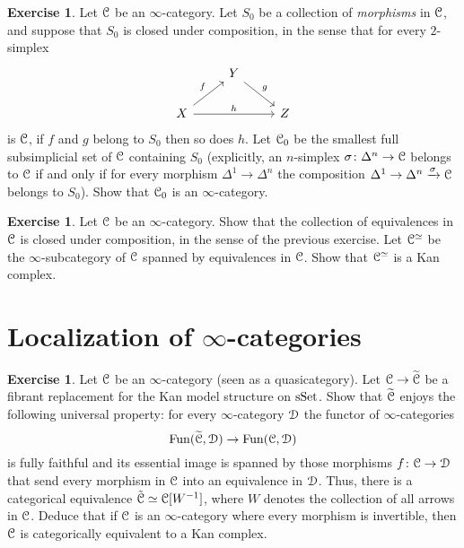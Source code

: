 \documentclass[10pt,a4paper,reqno,oneside]{book} %
\theoremstyle{plain}
\theoremstyle{definition}
\newtheorem{exercise}[thm]{Exercise}
\theoremstyle{remark}
\numberwithin{equation}{section}
\begin{document}
\begin{exercise}
	Let $\mathcal C$ be an $\infty$-category.
	Let $S_0$ be a collection of \emph{morphisms} in $\mathcal C$, and suppose that $S_0$ is closed under composition, in the sense that for every $2$-simplex
	\[ \begin{tikzcd}
	{} & Y \arrow{dr}{g} \\
	X \arrow{ur}{f} \arrow{rr}{h} & & Z
	\end{tikzcd} \]
	is $\mathcal C$, if $f$ and $g$ belong to $S_0$ then so does $h$.
	Let $\mathcal C_0$ be the smallest full subsimplicial set of $\mathcal C$ containing $S_0$ (explicitly, an $n$-simplex $\sigma \colon \Delta^n \to \mathcal C$ belongs to $\mathcal C$ if and only if for every morphism $\Delta^1 \to \Delta^n$ the composition $\Delta^1 \to \Delta^n \xrightarrow{\sigma} \mathcal C$ belongs to $S_0$).
	Show that $\mathcal C_0$ is an $\infty$-category.
\end{exercise}

\begin{exercise}
	Let $\mathcal C$ be an $\infty$-category. Show that the collection of equivalences in $\mathcal C$ is closed under composition, in the sense of the previous exercise.
	Let $\mathcal C^{\simeq}$ be the $\infty$-subcategory of $\mathcal C$ spanned by equivalences in $\mathcal C$.
	Show that $\mathcal C^{\simeq}$ is a Kan complex.
\end{exercise}

\section{Localization of $\infty$-categories}

\begin{exercise} \label{ex:eveloping_groupoid}
	Let $\mathcal C$ be an $\infty$-category (seen as a quasicategory).
	Let $\mathcal C \to \widetilde{\mathcal C}$ be a fibrant replacement for the Kan model structure on $\mathrm{sSet}$.
	Show that $\widetilde{\mathcal C}$ enjoys the following universal property: for every $\infty$-category $\mathcal D$ the functor of $\infty$-categories
	\[ \operatorname{Fun}(\widetilde{\mathcal C}, \mathcal D) \to \operatorname{Fun}(\mathcal C, \mathcal D) \]
	is fully faithful and its essential image is spanned by those morphisms $f \colon \mathcal C \to \mathcal D$ that send every morphism in $\mathcal C$ into an equivalence in $\mathcal D$.
	Thus, there is a categorical equivalence $\tilde{\mathcal C} \simeq \mathcal C[W^{-1}]$, where $W$ denotes the collection of all arrows in $\mathcal C$.
	Deduce that if $\mathcal C$ is an $\infty$-category where every morphism is invertible, then $\mathcal C$ is categorically equivalent to a Kan complex.
\end{exercise}
\end{document}
